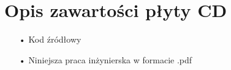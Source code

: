 \chapter{Opis zawartości płyty CD}
\label{chapter:dodatek_C}

\begin{itemize}
\item[•]{Kod źródłowy}
\item[•]{Niniejsza praca inżynierska w formacie .pdf}
\end{itemize}
